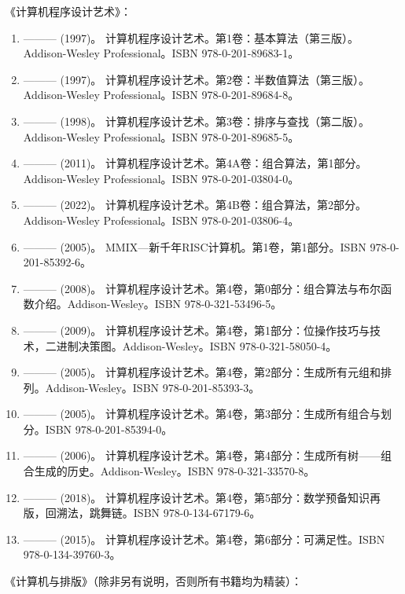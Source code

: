 《计算机程序设计艺术》：
\begin{enumerate}
\item ——— (1997)。 计算机程序设计艺术。第1卷：基本算法（第三版）。Addison-Wesley Professional。ISBN 978-0-201-89683-1。  
\item ——— (1997)。 计算机程序设计艺术。第2卷：半数值算法（第三版）。Addison-Wesley Professional。ISBN 978-0-201-89684-8。  
\item ——— (1998)。 计算机程序设计艺术。第3卷：排序与查找（第二版）。Addison-Wesley Professional。ISBN 978-0-201-89685-5。  
\item ——— (2011)。 计算机程序设计艺术。第4A卷：组合算法，第1部分。Addison-Wesley Professional。ISBN 978-0-201-03804-0。  
\item ——— (2022)。 计算机程序设计艺术。第4B卷：组合算法，第2部分。Addison-Wesley Professional。ISBN 978-0-201-03806-4。  
\item ——— (2005)。 MMIX—新千年RISC计算机。第1卷，第1部分。ISBN 978-0-201-85392-6。  
\item ——— (2008)。 计算机程序设计艺术。第4卷，第0部分：组合算法与布尔函数介绍。Addison-Wesley。ISBN 978-0-321-53496-5。  
\item ——— (2009)。 计算机程序设计艺术。第4卷，第1部分：位操作技巧与技术，二进制决策图。Addison-Wesley。ISBN 978-0-321-58050-4。  
\item ——— (2005)。 计算机程序设计艺术。第4卷，第2部分：生成所有元组和排列。Addison-Wesley。ISBN 978-0-201-85393-3。  
\item ——— (2005)。 计算机程序设计艺术。第4卷，第3部分：生成所有组合与划分。ISBN 978-0-201-85394-0。  
\item ——— (2006)。 计算机程序设计艺术。第4卷，第4部分：生成所有树——组合生成的历史。Addison-Wesley。ISBN 978-0-321-33570-8。  
\item ——— (2018)。 计算机程序设计艺术。第4卷，第5部分：数学预备知识再版，回溯法，跳舞链。ISBN 978-0-134-67179-6。  
\item ——— (2015)。 计算机程序设计艺术。第4卷，第6部分：可满足性。ISBN 978-0-134-39760-3。 
\end{enumerate} 
《计算机与排版》（除非另有说明，否则所有书籍均为精装）：

